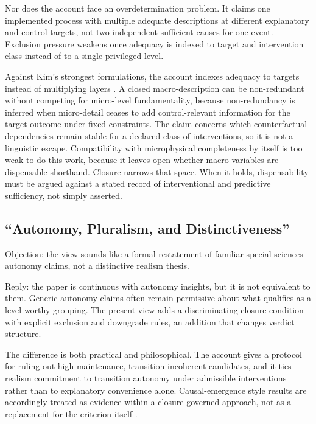 Nor does the account face an overdetermination problem. It claims one
implemented process with multiple adequate descriptions at different
explanatory and control targets, not two independent sufficient causes
for one event. Exclusion pressure weakens once adequacy is indexed to
target and intervention class instead of to a single privileged level.

Against Kim's strongest formulations, the account indexes adequacy to
targets instead of multiplying layers \citep{kim1998,kim2005}. A
closed macro-description can be non-redundant without competing for
micro-level fundamentality, because non-redundancy is inferred when
micro-detail ceases to add control-relevant information for the target
outcome under fixed constraints. The claim concerns which
counterfactual dependencies remain stable for a declared class of
interventions, so it is not a linguistic escape. Compatibility with
microphysical completeness by itself is too weak to do this work,
because it leaves open whether macro-variables are dispensable
shorthand. Closure narrows that space. When it holds, dispensability
must be argued against a stated record of interventional and predictive
sufficiency, not simply asserted.

\subsection{``Autonomy, Pluralism, and
	Distinctiveness''}\label{autonomy-pluralism-and-distinctiveness}

Objection: the view sounds like a formal restatement of familiar
special-sciences autonomy claims, not a distinctive realism thesis.

Reply: the paper is continuous with autonomy insights, but it is not
equivalent to them. Generic autonomy claims often remain permissive
about what qualifies as a level-worthy grouping. The present view adds a
discriminating closure condition with explicit exclusion and downgrade
rules, an addition that changes verdict structure.

The difference is both practical and philosophical. The account gives a
protocol for ruling out high-maintenance, transition-incoherent
candidates, and it ties realism commitment to transition autonomy under
admissible interventions rather than to explanatory convenience alone.
Causal-emergence style results are accordingly treated as evidence
within a closure-governed approach, not as a replacement for the
criterion itself \citep{hoel2013}.

